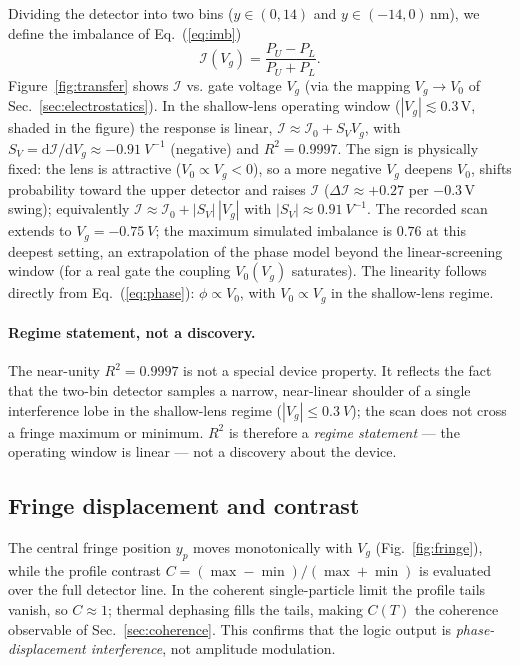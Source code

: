 \documentclass[11pt,a4paper]{article}
\begin{document}
Dividing the detector into two bins ($y\in(0,14)$ and $y\in(-14,0)\,$nm), we 
define the imbalance of Eq.~(\ref{eq:imb})
\begin{equation}
\mathcal{I}(V_g) = \frac{P_U - P_L}{P_U + P_L}.
\label{eq:imb}
\end{equation}
Figure~\ref{fig:transfer} shows $\mathcal{I}$ vs. gate voltage $V_g$ (via the 
mapping $V_g\to V_0$ of Sec.~\ref{sec:electrostatics}). In the shallow-lens 
operating window ($|V_g|\lesssim 0.3\,$V, shaded in the figure) the response 
is linear, $\mathcal{I}\approx\mathcal{I}_0+S_V V_g$, with 
$S_V=\mathrm{d}\mathcal{I}/\mathrm{d}V_g\approx\SI{-0.91}{V^{-1}}$ (negative) 
and $R^2=0.9997$. The sign is physically fixed: the lens is attractive 
($V_0\propto V_g<0$), so a more negative $V_g$ deepens $V_0$, shifts 
probability toward the upper detector and raises $\mathcal{I}$ 
($\Delta\mathcal{I}\approx+0.27$ per $-0.3\,$V swing); equivalently 
$\mathcal{I}\approx\mathcal{I}_0+|S_V|\,|V_g|$ with 
$|S_V|\approx\SI{0.91}{V^{-1}}$. The recorded scan extends to 
$V_g=\SI{-0.75}{V}$; the maximum simulated imbalance is $0.76$ at this deepest 
setting, an extrapolation of the phase model beyond the linear-screening window 
(for a real gate the coupling $V_0(V_g)$ saturates). The linearity follows
directly from Eq.~(\ref{eq:phase}): $\phi\propto V_0$, with $V_0\propto V_g$ in
the shallow-lens regime.

\paragraph{Regime statement, not a discovery.} The near-unity
$R^2=0.9997$ is not a special device property. It reflects the fact that the
two-bin detector samples a narrow, near-linear shoulder of a single
interference lobe in the shallow-lens regime ($|V_g|\le\SI{0.3}{V}$); the
scan does not cross a fringe maximum or minimum. $R^2$ is therefore a
\emph{regime statement} — the operating window is linear — not a discovery
about the device.

\subsection{Fringe displacement and contrast}
\label{sec:fringe}

The central fringe position $y_p$ moves monotonically with $V_g$ 
(Fig.~\ref{fig:fringe}), while the profile contrast 
$C=(\max-\min)/(\max+\min)$ is evaluated over the full detector line. In 
the coherent single-particle limit the profile tails vanish, so $C\approx1$; 
thermal dephasing fills the tails, making $C(T)$ the coherence observable of 
Sec.~\ref{sec:coherence}. This confirms that the logic output is 
\emph{phase-displacement interference}, not amplitude modulation.
\end{document}

